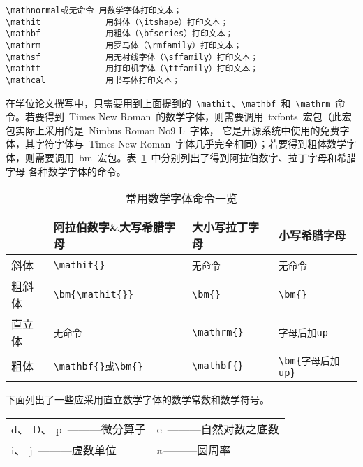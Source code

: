 \begin{verbatim}
\mathnormal或无命令 用数学字体打印文本；
\mathit             用斜体（\itshape）打印文本；
\mathbf             用粗体（\bfseries）打印文本；
\mathrm             用罗马体（\rmfamily）打印文本；
\mathsf             用无衬线字体（\sffamily）打印文本；
\mathtt             用打印机字体（\ttfamily）打印文本；
\mathcal            用书写体打印文本；
\end{verbatim}

在学位论文撰写中，只需要用到上面提到的~\verb|\mathit|、\verb|\mathbf|~和~\verb|\mathrm|~命令。若要得到~Times New Roman~的数学字体，则需要调用~txfonts~宏包（此宏包实际上采用的是~Nimbus Roman No9 L~字体，
它是开源系统中使用的免费字体，其字符字体与~Times New Roman~字体几乎完全相同）；若要得到粗体数学字体，则需要调用~bm~宏包。表~\ref{tab:fonts}~中分别列出了得到阿拉伯数字、拉丁字母和希腊字母
各种数学字体的命令。

\begin{table}[htbp]
\caption{常用数学字体命令一览}\label{tab:fonts}
\vspace{0.5em}\centering\wuhao
\begin{tabular}{llll}
\toprule
 & 阿拉伯数字\&大写希腊字母 & 大小写拉丁字母 & 小写希腊字母  \\
\midrule
斜体 & \verb|\mathit{}| & \verb|无命令| & \verb|无命令|\\
粗斜体 & \verb|\bm{\mathit{}}| & \verb|\bm{}| & \verb|\bm{}|\\
直立体 & \verb|无命令| & \verb|\mathrm{}| & \verb|字母后加up|\\
粗体 & \verb|\mathbf{}或\bm{}| & \verb|\mathbf{}| & \verb|\bm{字母后加up}|\\
\bottomrule
\end{tabular}
\vspace{\baselineskip}
\end{table}

\noindent 下面列出了一些应采用直立数学字体的数学常数和数学符号。

\vspace{-0.5em}\begin{center}\begin{tabularx}{0.7\textwidth}{XX}
$\mathrm{d}$、 $\mathrm{D}$、 $\mathrm{p}$~———微分算子 & $\mathrm{e}$~———自然对数之底数\\
$\mathrm{i}$、 $\mathrm{j}$~———虚数单位 & $\piup$———圆周率\\
\end{tabularx}\end{center}

